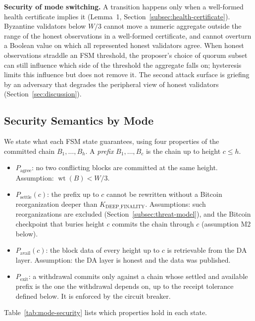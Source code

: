 \textbf{Security of mode switching.} A transition happens only when a
well-formed health certificate implies it (Lemma~1,
Section~\ref{subsec:health-certificate}). Byzantine validators below $W/3$
cannot move a numeric aggregate outside the range of the honest observations
in a well-formed certificate, and cannot overturn a Boolean value on which all
represented honest validators agree. When honest observations straddle an FSM
threshold, the proposer's choice of quorum subset can still influence which
side of the threshold the aggregate falls on; hysteresis limits this
influence but does not remove it. The second attack surface is griefing by an
adversary that degrades the peripheral view of honest validators
(Section~\ref{sec:discussion}).

\subsection{Security Semantics by Mode}
\label{subsec:security-semantics}

We state what each FSM state guarantees, using four properties of the
committed chain $B_1, \dots, B_h$. A \emph{prefix} $B_1, \dots, B_c$ is the
chain up to height $c \leq h$.
\begin{itemize}
  \item $P_{\text{agree}}$: no two conflicting blocks are committed at the
  same height. Assumption: $\operatorname{wt}(B) < W/3$.
  \item $P_{\text{settle}}(c)$: the prefix up to $c$ cannot be rewritten
  without a Bitcoin reorganization deeper than $K_{\text{DEEP\_FINALITY}}$.
  Assumptions: such reorganizations are excluded
  (Section~\ref{subsec:threat-model}), and the Bitcoin checkpoint that
  buries height $c$ commits the chain through $c$ (assumption M2 below).
  \item $P_{\text{avail}}(c)$: the block data of every height up to $c$ is
  retrievable from the DA layer. Assumption: the DA layer is honest and the
  data was published.
  \item $P_{\text{exit}}$: a withdrawal commits only against a chain whose
  settled and available prefix is the one the withdrawal depends on, up to
  the receipt tolerance defined below. It is enforced by the circuit
  breaker.
\end{itemize}

Table~\ref{tab:mode-security} lists which properties hold in each state.

